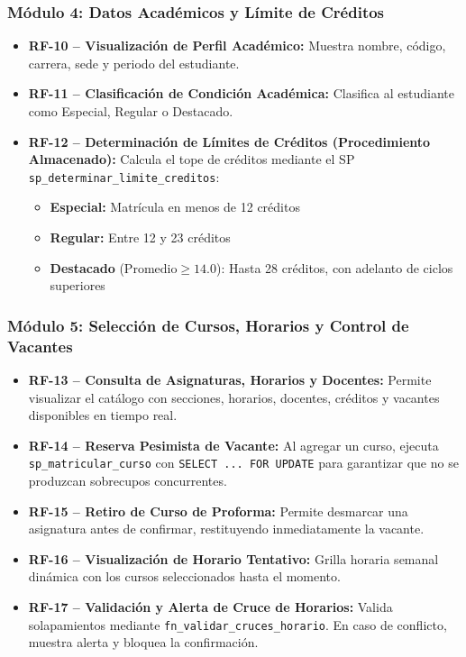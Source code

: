 \documentclass[12pt,a4paper]{article}
\begin{document}
\subsubsection{M\'odulo 4: Datos Acad\'emicos y L\'imite de Cr\'editos}

\begin{itemize}[leftmargin=*]
  \item \textbf{RF-10 -- Visualizaci\'on de Perfil Acad\'emico:}
    Muestra nombre, c\'odigo, carrera, sede y periodo del estudiante.

  \item \textbf{RF-11 -- Clasificaci\'on de Condici\'on Acad\'emica:}
    Clasifica al estudiante como Especial, Regular o Destacado.

  \item \textbf{RF-12 -- Determinaci\'on de L\'imites de Cr\'editos (Procedimiento Almacenado):}
    Calcula el tope de cr\'editos mediante el SP \texttt{sp\_determinar\_limite\_creditos}:
    \begin{itemize}
      \item \textbf{Especial:} Matr\'icula en menos de 12 cr\'editos
      \item \textbf{Regular:} Entre 12 y 23 cr\'editos
      \item \textbf{Destacado} ($\text{Promedio} \geq 14.0$): Hasta 28 cr\'editos, con adelanto de ciclos superiores
    \end{itemize}
\end{itemize}

\subsubsection{M\'odulo 5: Selecci\'on de Cursos, Horarios y Control de Vacantes}

\begin{itemize}[leftmargin=*]
  \item \textbf{RF-13 -- Consulta de Asignaturas, Horarios y Docentes:}
    Permite visualizar el cat\'alogo con secciones, horarios, docentes, cr\'editos y vacantes disponibles en tiempo real.

  \item \textbf{RF-14 -- Reserva Pesimista de Vacante:}
    Al agregar un curso, ejecuta \texttt{sp\_matricular\_curso} con \texttt{SELECT ... FOR UPDATE} para garantizar que no se produzcan sobrecupos concurrentes.

  \item \textbf{RF-15 -- Retiro de Curso de Proforma:}
    Permite desmarcar una asignatura antes de confirmar, restituyendo inmediatamente la vacante.

  \item \textbf{RF-16 -- Visualizaci\'on de Horario Tentativo:}
    Grilla horaria semanal din\'amica con los cursos seleccionados hasta el momento.

  \item \textbf{RF-17 -- Validaci\'on y Alerta de Cruce de Horarios:}
    Valida solapamientos mediante \texttt{fn\_validar\_cruces\_horario}. En caso de conflicto, muestra alerta y bloquea la confirmaci\'on.
\end{itemize}
\end{document}
